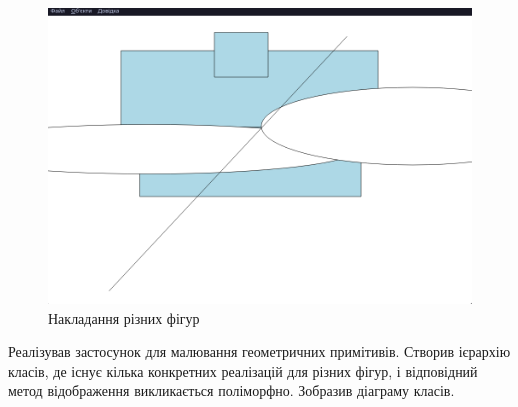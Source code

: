 \begin{figure}[t]
  \center\includegraphics[width=0.7\linewidth]{overlapping.png}
	\caption{Накладання різних фігур}
\end{figure}

\pagebreak

\conclusion%
Реалізував застосунок для малювання геометричних примітивів.
Створив ієрархію класів, де існує кілька конкретних реалізацій для різних
фігур, і відповідний метод відображення викликається поліморфно.
Зобразив діаграму класів.



